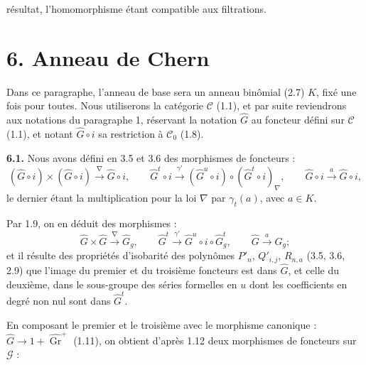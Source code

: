 résultat, l'homomorphisme étant compatible aux filtrations.

\section*{6. Anneau de Chern}

Dans ce paragraphe, l'anneau de base sera un anneau binômial (2.7) \(K\), fixé une fois pour toutes. Nous utiliserons la catégorie \(\mathcal C\) (1.1), et par suite reviendrons aux notations du paragraphe 1, réservant la notation \(\widehat G\) au foncteur défini sur \(\mathcal C\) (1.1), et notant \(\widehat G\circ i\) sa restriction à \(\mathcal C_0\) (1.8).

\textbf{6.1.} Nous avons défini en 3.5 et 3.6 des morphismes de foncteurs :
\[
  (\widehat G\circ i)\times(\widehat G\circ i)\xrightarrow{\nabla}\widehat G\circ i,
  \qquad
  \widehat G^t\circ i\xrightarrow{\gamma'}(\widehat G^u\circ i)\circ(\widehat G^t\circ i)_\nabla,
  \qquad
  \widehat G\circ i\xrightarrow{a}\widehat G\circ i,
\]
le dernier étant la multiplication pour la loi \(\nabla\) par \(\gamma_t(a)\), avec \(a\in K\).

Par 1.9, on en déduit des morphismes :
\[
  \widehat G\times\widehat G\xrightarrow{\nabla}\widehat G_g,
  \qquad
  \widehat G^t\xrightarrow{\gamma'}\widehat G^u\circ i\circ\widehat G^t_g,
  \qquad
  \widehat G\xrightarrow{a}\widehat G_g;
\]
et il résulte des propriétés d'isobarité des polynômes \(P'_n\), \(Q'_{i,j}\), \(R_{n,a}\) (3.5, 3.6, 2.9) que l'image du premier et du troisième foncteurs est dans \(\widehat G\), et celle du deuxième, dans le sous-groupe des séries formelles en \(u\) dont les coefficients en degré non nul sont dans \(\widehat G^t\).

En composant le premier et le troisième avec le morphisme canonique : \(\widehat G\longrightarrow 1+\widehat{\operatorname{Gr}}^{+}\) (1.11), on obtient d'après 1.12 deux morphismes de
foncteurs sur \(\mathcal G\) :
